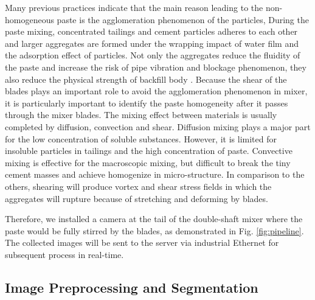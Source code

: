\documentclass[pdflatex,sn-mathphys]{sn-jnl}%
\theoremstyle{thmstyleone}%
\theoremstyle{thmstyletwo}%
\theoremstyle{thmstylethree}%
\begin{document}
Many previous practices indicate that the main reason leading to the non-homogeneous paste is the agglomeration phenomenon of the particles\cite{wu2019rheology}, 
During the paste mixing, concentrated tailings and cement particles adheres to each other and larger aggregates are formed under the wrapping impact of water film and the adsorption effect of particles\cite{QI2019106025}. 
Not only the aggregates reduce the fluidity of the paste and increase the risk of pipe vibration and blockage phenomenon, they also reduce the physical strength of backfill body \cite{tailingsManagement}.
Because the shear of the blades plays an important role to avoid the agglomeration phenomenon\cite{yang2019research} in mixer, it is particularly important to identify the paste homogeneity after it passes through the mixer blades. 
The mixing effect between materials is usually completed by diffusion, convection and shear\cite{lacey1954developments}. 
Diffusion mixing plays a major part for the low concentration of soluble substances.
However, it is limited for insoluble particles in tailings and the high concentration of paste.
Convective mixing is effective for the macroscopic mixing, but difficult to break the tiny cement masses and achieve homogenize in micro-structure. 
In comparison to the others, shearing will produce vortex and shear stress fields in which the aggregates will rupture because of stretching and deforming by blades.

Therefore, we installed a camera at the tail of the double-shaft mixer where the paste would be fully stirred by the blades, as demonstrated in Fig. \ref{fig:pipeline}. 
The collected images will be sent to the server via industrial Ethernet for subsequent process in real-time.


\subsection{Image Preprocessing and Segmentation}
\end{document}
